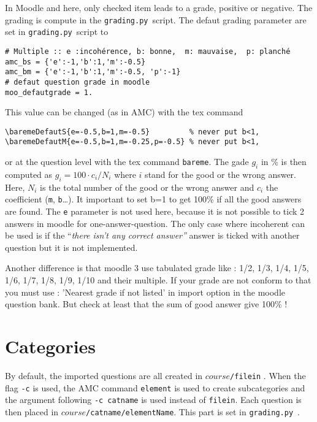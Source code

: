 \documentclass[a4paper]{article}
\newcommand{\py}{\texttt{grading.py}~}
\begin{document}
In Moodle and here, only checked item leads to a grade, positive or negative. The grading is compute in the \py script.
The defaut grading parameter are set in \py script to
\begin{verbatim}
# Multiple :: e :incohérence, b: bonne,  m: mauvaise,  p: planché
amc_bs = {'e':-1,'b':1,'m':-0.5}              
amc_bm = {'e':-1,'b':1,'m':-0.5, 'p':-1}   
# defaut question grade in moodle
moo_defautgrade = 1.                       
\end{verbatim}
This value can be changed (as in AMC) with the tex command
\begin{verbatim}
\baremeDefautS{e=-0.5,b=1,m=-0.5}         % never put b<1,
\baremeDefautM{e=-0.5,b=1,m=-0.25,p=-0.5} % never put b<1,
\end{verbatim}
or at the question level with the tex command \texttt{bareme}.
The gade $g_i$ in \% is then computed as
$g_i = 100\cdot c_i / N_i$ where $i$ stand for the good or the wrong answer. Here, $N_i$ is the total number of the good or the wrong answer and $c_i$ the coefficient (\texttt{m}, \texttt{b}\dots). It important to set b=1 to get 100\% if all the good answers are found. The \texttt{e} parameter is not used here, because it is not possible to tick 2 answers in moodle for one-answer-question. The only case where incoherent can be used is if the ``\emph{there isn't any correct answer''} answer is ticked with another question but it is not implemented.

Another difference is that moodle 3 use tabulated grade like : 1/2, 1/3, 1/4, 1/5, 1/6, 1/7, 1/8, 1/9, 1/10 and their multiple. If your grade are not conform to that you must use : 'Nearest grade if not listed' in import option in the moodle question bank. But check at least that the sum of good answer give 100\% !




 
\section{Categories}
By default, the imported questions are all created in \texttt{$course$/filein}  . When the flag \texttt{-c} is used, the AMC command \texttt{element} is used to create subcategories and the argument following \texttt{-c catname} is used instead of \texttt{filein}.
Each question is then placed in \texttt{$course$/catname/elementName}.
This part is set in \py.
\end{document}
